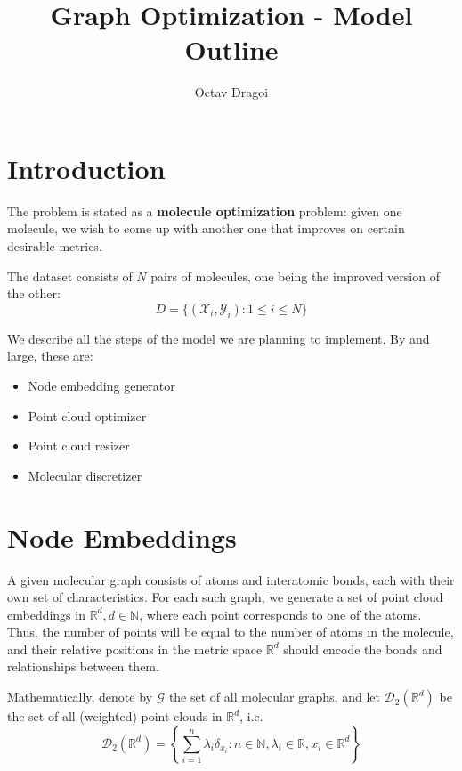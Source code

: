\documentclass{article}
\begin{document}
\title{Graph Optimization - Model Outline}
\author{Octav Dragoi}

\maketitle

\section{Introduction}

The problem is stated as a \textbf{molecule optimization} problem: given one molecule, we wish to come up with another one that improves on certain desirable metrics.

The dataset consists of $N$ pairs of molecules, one being the improved version of the other:
\begin{equation}
    \label{eq:problem_setup}
    D = \{(\mathcal{X}_i, \mathcal{Y}_i) : 1\leq i\leq N\}
\end{equation}

We describe all the steps of the model we are planning to implement. By and large, these are:
\begin{itemize}
    \item Node embedding generator
    \item Point cloud optimizer
    \item Point cloud resizer
    \item Molecular discretizer
\end{itemize}

\section{Node Embeddings}
A given molecular graph consists of atoms and interatomic bonds, each with their own set of characteristics. For each such graph, we generate a set of point cloud embeddings in $\mathbb{R}^d, d\in \mathbb{N}$, where each point corresponds to one of the atoms. Thus, the number of points will be equal to the number of atoms in the molecule, and their relative positions in the metric space $\mathbb{R}^d$ should encode the bonds and relationships between them.

Mathematically, denote by $\mathcal{G}$ the set of all molecular graphs, and let $\mathscr{D}_2(\mathbb{R}^d)$ be the set of all (weighted) point clouds in $\mathbb{R}^d$, i.e. 
\[\mathscr{D}_2({\mathbb{R}^d}) = \left\{\sum_{i=1}^{n}\lambda_i\delta_{x_i} : n\in \mathbb{N}, \lambda_i\in\mathbb{R}, x_i\in {\mathbb{R}^d} \right\} \]
\end{document}
